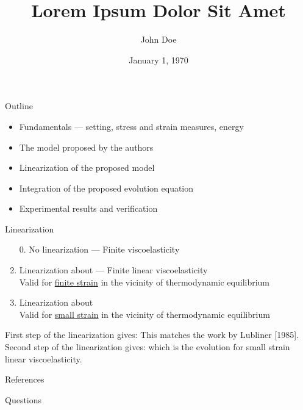 \documentclass{beamer}
\title[]{Lorem Ipsum Dolor Sit Amet}
\date[Jan. 1]{January 1, 1970}
\author[J. Doe]{John Doe}
\begin{document}
\frame{\maketitle}

\begin{frame}{Outline}
  \begin{itemize}[<+->]
  \item Fundamentals --- setting, stress and strain measures, energy
  \item The model proposed by the authors
  \item Linearization of the proposed model
  \item Integration of the proposed evolution equation
  \item Experimental results and verification
  \end{itemize}
\end{frame}

\begin{frame}[allowframebreaks]{Linearization}

  \begin{enumerate}

  \item[0.]\setcounter{enumi}{0} No linearization --- Finite viscoelasticity
  \item Linearization about --- Finite linear viscoelasticity
    \\ Valid for \underline{finite strain} in the vicinity of thermodynamic equilibrium
  \item Linearization about
    \\ Valid for \underline{small strain} in the vicinity of thermodynamic equilibrium
  \end{enumerate}

  \framebreak

  First step of the linearization gives:
  This matches the work by Lubliner [1985].
  \\[2em]
  Second step of the linearization gives:
  which is the evolution for small strain linear viscoelasticity.
\end{frame}


\begin{frame}{References}

\end{frame}


\begin{frame}{Questions}

\end{frame}
\end{document}
